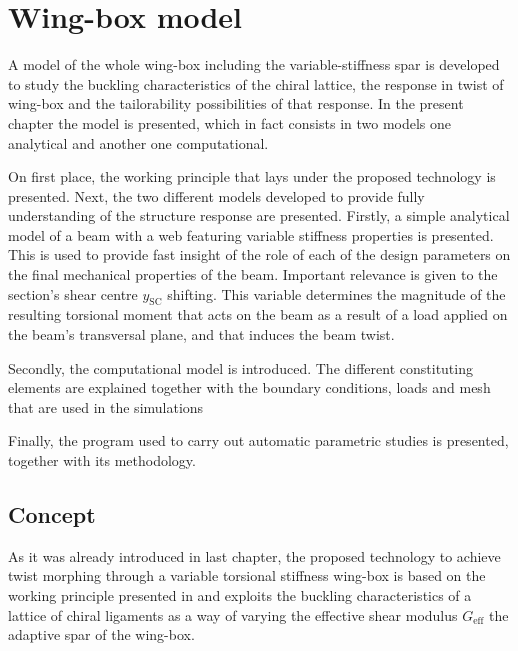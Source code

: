 \chapter{Wing-box model} \label{chap:Model}
  
  A model of the whole wing-box including the variable-stiffness spar is developed to study the buckling characteristics of the chiral lattice, the response in twist of wing-box and the tailorability possibilities of that response. In the present chapter the model is presented, which in fact consists in two models one analytical and another one computational. 

  On first place, the working principle that lays under the proposed technology is presented. Next, the two different models developed to provide fully understanding of the structure response are presented. Firstly, a simple analytical model of a beam with a web featuring variable stiffness properties is presented. This is used to provide fast insight of the role of each of the design parameters on the final mechanical properties of the beam. Important relevance is given to the section's shear centre $y_{\mathrm{SC}}$ shifting. This variable determines the magnitude of the resulting torsional moment that acts on the beam as a result of a load applied on the beam's transversal plane, and that induces the beam twist.

  Secondly, the computational model is introduced. The different constituting elements are explained together with the boundary conditions, loads and mesh that are used in the simulations 

  Finally, the program used to carry out automatic parametric studies is presented, together with its methodology.

\section{Concept} \label{sec:concept_Model}

  As it was already introduced in last chapter, the proposed technology to achieve twist morphing through a variable torsional stiffness wing-box is based on the working principle presented in \cite{Raither2013a} and exploits the buckling characteristics of a lattice of chiral ligaments as a way of varying the effective shear modulus $G_{\mathrm{eff}}$ the adaptive spar of the wing-box.

